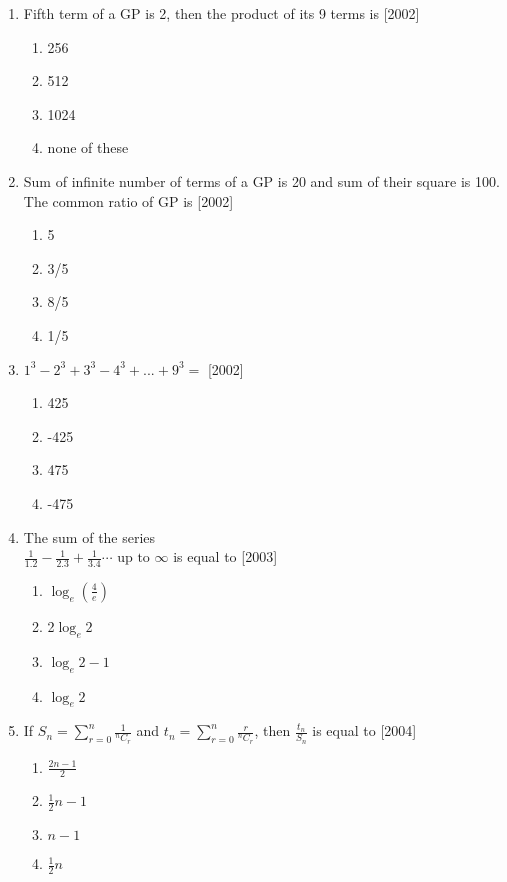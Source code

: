 \documentclass[journal,12pt,twocolumn]{IEEEtran}
\theoremstyle{remark}
\begin{document}
\begin{enumerate}[label={\arabic*.}]
\item {Fifth term of a GP is 2, then the product of its 9 terms is}
{\hfill{[2002]}}
\begin{enumerate}[label={(\alph*)}]
\item  {256}
\item  {512}
\item  {1024}
\item  {none of these}
\end{enumerate}

\item {Sum of infinite number of terms of a GP is 20 and sum of their square is 100. The common ratio of GP is}
{\hfill{[2002]}} 
\begin{enumerate}[label={(\alph*)}]
\item  {5}
\item  {3/5}
\item  {8/5}
\item  {1/5}
\end{enumerate} 

\item {$1^{3}-2^{3}+3^{3}-4^{3}+...
+9^{3}=$}
{\hfill{[2002]}} 
\begin{enumerate}[label={(\alph*)}]
\item  {425}
\item  {-425}
\item  {475}
\item  {-475}
\end{enumerate}

\item {The sum of the series \\ $\frac{1}{1.2}-\frac{1}{2.3}+\frac{1}{3.4}\cdots \text{ up to } \infty$ is equal to} 
{\hfill{[2003]}} 
\begin{enumerate}[label={(\alph*)}]
\item  {$\log_e (\frac{4}{e})$}
\item  {2$\log_e 2$}
\item  {$\log_e 2-1$}
\item  {$\log_e 2$}
\end{enumerate}

\item {If $S_n = \sum\limits_{r=0}^{n} \frac{1}{{}^{n}C_{r}}$ and $t_n = \sum\limits_{r=0}^{n} \frac{r}{{}^{n}C_{r}}$, then $\frac{t_n}{S_n}$ is equal to}
{\hfill{[2004]}} 
\begin{enumerate}[label={(\alph*)}]
\item  {$\frac{2n-1}{2}$}
\item  {$\frac{1}{2}n-1$}
\item  {$n-1$}
\item  {$\frac{1}{2}n$}
\end{enumerate}


\end{enumerate}
\end{document}
